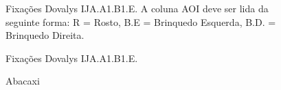 \documentclass{article}
\begin{document}
\begin{figure}[t]
\caption{Fixações Dovalys IJA.A1.B1.E. A coluna AOI deve ser lida da seguinte forma: R = Rosto, B.E = Brinquedo Esquerda, B.D. = Brinquedo Direita.}
\noindent{}
\centering
\end{figure}

\begin{figure}[t]
\caption{Fixações Dovalys IJA.A1.B1.E.}
\noindent{}
\centering
\end{figure}


\begin{figure}[t]
\caption{Abacaxi}
\noindent{}
\centering
\end{figure}
\end{document}
